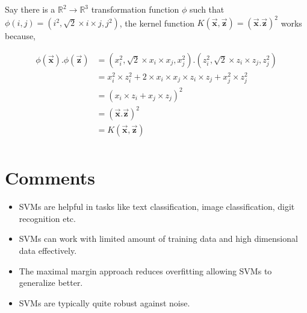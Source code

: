 \documentclass[11pt, a4paper]{article}
\begin{document}
Say there is a $\mathbb{R}^2 \rightarrow \mathbb{R}^3$ transformation function $\phi$ such that $\phi(i, j) = (i^2, \sqrt{2} \times i \times j, j^2)$, the kernel function $K(\vec{\mathbf{x}}, \vec{\mathbf{z}}) = (\vec{\mathbf{x}}.\vec{\mathbf{z}})^2$ works because,

\begin{align*}
	\phi(\vec{\mathbf{x}}).\phi(\vec{\mathbf{z}}) & = (x_i^2, \sqrt{2} \times x_i \times x_j, x_j^2).(z_i^2, \sqrt{2} \times z_i \times z_j, z_j^2) \\
	                                              & = x_i^2 \times z_i^2 + 2 \times x_i \times x_j \times z_i \times z_j + x_j^2 \times z_j^2       \\
	                                              & = (x_i \times z_i + x_j \times z_j)^2                                                           \\
	                                              & = (\vec{\mathbf{x}}.\vec{\mathbf{z}})^2                                                         \\
	                                              & = K(\vec{\mathbf{x}}, \vec{\mathbf{z}})                                                         \\
\end{align*}

\section{Comments}

\begin{itemize}
	\item SVMs are helpful in tasks like text classification, image classification, digit recognition etc.
	\item SVMs can work with limited amount of training data and high dimensional data effectively.
	\item The maximal margin approach reduces overfitting allowing SVMs to generalize better.
	\item SVMs are typically quite robust against noise.
\end{itemize} 
\end{document}
